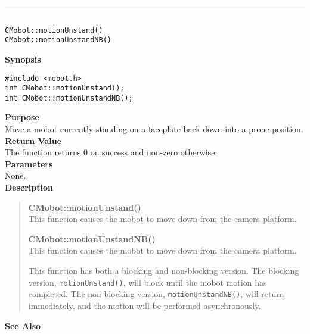 \noindent
\vspace{5pt}
\rule{4.5in}{0.015in}\\
\noindent
{\LARGE \texttt{CMobot::motionUnstand()}}\\
{\LARGE \texttt{CMobot::motionUnstandNB()}}\\
{}

\noindent
{\bf Synopsis}
\vspace{-8pt}
\begin{verbatim}
#include <mobot.h>
int CMobot::motionUnstand();
int CMobot::motionUnstandNB();
\end{verbatim}

\noindent
{\bf Purpose}\\
Move a mobot currently standing on a faceplate back down into a prone position.\\

\noindent
{\bf Return Value}\\
The function returns 0 on success and non-zero otherwise.\\

\noindent
{\bf Parameters}\\
None.\\

\noindent
{\bf Description}\\
\vspace{-12pt}
\begin{quote}
{\bf CMobot::motionUnstand()}\\
This function causes the mobot to move down from the camera platform.

{\bf CMobot::motionUnstandNB()}\\
This function causes the mobot to move down from the camera platform.

This function has both a blocking and non-blocking version.
The blocking version, \texttt{motionUnstand()}, will block until the
mobot motion has completed. The non-blocking version, \texttt{motionUnstandNB()},
will return immediately, and the motion will be performed asynchronously.\\
\end{quote}

\noindent
{\bf See Also}\\

